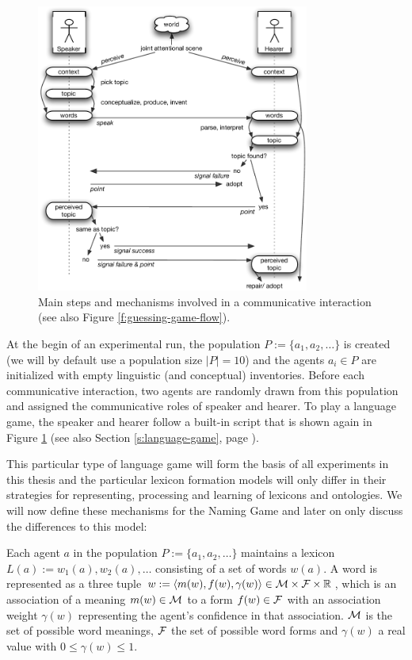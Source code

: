 \begin{figure}[t]
  \centerline{\includegraphics[width=0.80\textwidth]{figures/guessing-game-flow}}
  \caption{Main steps and mechanisms involved in a communicative
    interaction (see also Figure
    \ref{f:guessing-game-flow}).}
  \label{f:guessing-game-flow-2}
\end{figure}

At the begin of an experimental run, the population $P :=
\{a_1,a_2,\dots\}$ is created (we will by default use a population
size $|P| = 10$) and the agents $a_i \in P$ are initialized with empty
linguistic (and conceptual) inventories. Before each communicative
interaction, two agents are randomly drawn from this population and
assigned the communicative roles of speaker and hearer. To play a
language game, the speaker and hearer follow a built-in script that is
shown again in Figure \ref{f:guessing-game-flow-2} (see also Section
\ref{s:language-game}, page \pageref{s:language-game}). 

This particular type of language game will form the basis of all
experiments in this thesis and the particular lexicon formation models
will only differ in their strategies for representing, processing and
learning of lexicons and ontologies. We will now define these
mechanisms for the Naming Game and later on only discuss the
differences to this model:

 Each agent $a$ in the
population $P := \{a_1,a_2,\dots\}$ maintains a lexicon $L(a) :=
w_1(a),w_2(a),\dots$ consisting of a set of words $w(a)$. A word is
represented as a three tuple $w := \langle m(w), f(w), \gamma(w)
\rangle \in {\cal M}\times{\cal F}\times \mathbb{R}$, which is an
association of a meaning $m(w) \in {\cal M}$ to a form $f(w) \in {\cal
  F}$ with an association weight $\gamma(w)$ representing the agent's
confidence in that association. ${\cal M}$ is the set of possible word
meanings, ${\cal F}$ the set of possible word forms and $\gamma(w)$ a
real value with $0 \leq \gamma(w) \leq 1$.

